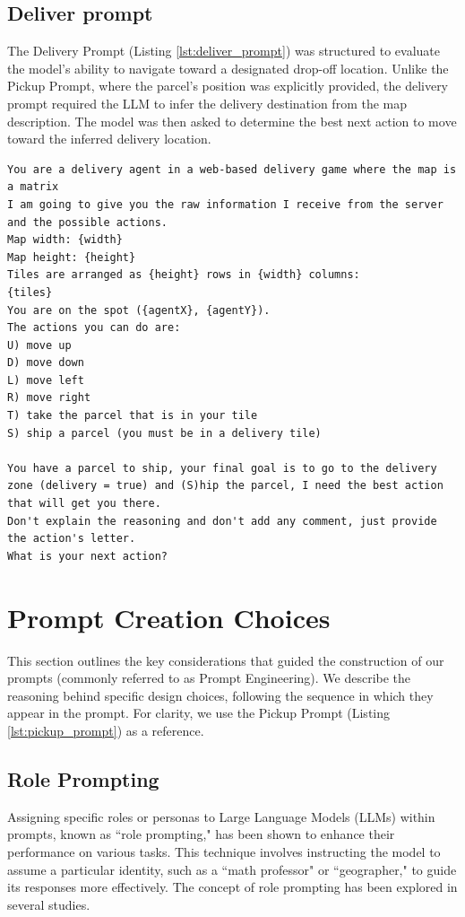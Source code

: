 \subsection{Deliver prompt}
The Delivery Prompt (Listing \ref{lst:deliver_prompt}) was structured to evaluate
the model's ability to navigate toward a designated drop-off location. Unlike
the Pickup Prompt, where the parcel's position was explicitly provided, the
delivery prompt required the LLM to infer the delivery destination from the map
description. The model was then asked to determine the best next action to move toward
the inferred delivery location.

\begin{codewindow}
  [Text]  \begin{lstlisting}
You are a delivery agent in a web-based delivery game where the map is a matrix
I am going to give you the raw information I receive from the server and the possible actions.
Map width: {width}
Map height: {height}
Tiles are arranged as {height} rows in {width} columns:
{tiles}
You are on the spot ({agentX}, {agentY}).
The actions you can do are:
U) move up
D) move down
L) move left
R) move right
T) take the parcel that is in your tile
S) ship a parcel (you must be in a delivery tile)

You have a parcel to ship, your final goal is to go to the delivery zone (delivery = true) and (S)hip the parcel, I need the best action that will get you there.
Don't explain the reasoning and don't add any comment, just provide the action's letter.
What is your next action?
\end{lstlisting}
\end{codewindow}

\section{Prompt Creation Choices}
\label{sec:prompt_creation_choices}

This section outlines the key considerations that guided the construction of our
prompts (commonly referred to as Prompt Engineering). We describe the reasoning
behind specific design choices, following the sequence in which they appear in the
prompt. For clarity, we use the Pickup Prompt (Listing \ref{lst:pickup_prompt}) as
a reference.

\subsection{Role Prompting}
Assigning specific roles or personas to Large Language Models (LLMs) within prompts,
known as ``role prompting," has been shown to enhance their performance on
various tasks. This technique involves instructing the model to assume a particular
identity, such as a ``math professor" or ``geographer," to guide its responses more
effectively. The concept of role prompting has been explored in several studies.

